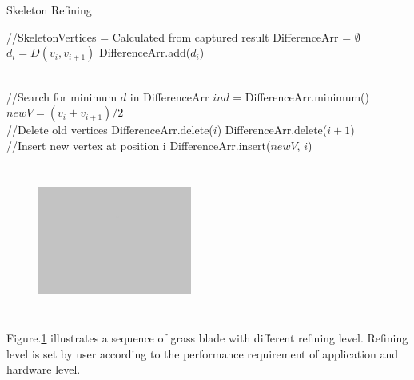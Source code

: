 \documentclass[10pt,journal,compsoc]{IEEEtran}
\begin{document}
    \begin{algorithm}
        \caption{Skeleton Refining}
        \label{tbl:skeletonrefining}
        \begin{algorithmic}[1]
            \State //SkeletonVertices = Calculated from captured result
                \State DifferenceArr = $\emptyset$
                    \State $d_i = D(v_{i}, v_{i+1})$
                    \State DifferenceArr.add($d_i$)
                \EndFor
                
                \\
                \State //Search for minimum $d$ in DifferenceArr
                \State $ind$ = DifferenceArr.minimum()
                \State $newV = (v_{i} + v_{i+1}) /2$
                \\
                \State //Delete old vertices
                \State DifferenceArr.delete($i$)
                \State DifferenceArr.delete($i+1$)
                \\
                \State //Insert new vertex at position i
                \State DifferenceArr.insert($newV$, $i$)
                
            \EndWhile
        \end{algorithmic}
    \end{algorithm}

\begin{figure}
    \centering
    \includegraphics[width=0.45\textwidth,height=5cm]{figs/test2.jpg}
    \label{fig:skeletonrefining}
\end{figure}

Figure.\ref{fig:skeletonrefining} illustrates a sequence of grass blade with different refining level. Refining level is set by user according to the performance requirement of application and hardware level.
\end{document}
